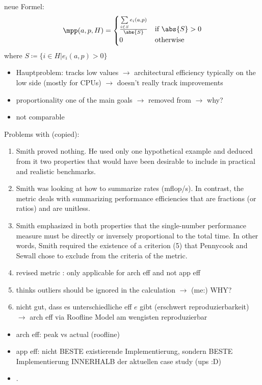 neue Formel:
\[ \mpp(a, p, H) = 
        \begin{cases}
            \frac{\sum\limits_{i \in S} e_i(a, p)}{\abs{S}} & \text{if }\abs{S} > 0 \\
            0                         & \text{otherwise}
        \end{cases} 
\]
where $S \coloneqq \{ i \in H | e_i(a, p) > 0 \}$

\begin{itemize}
    \item \pp Hauptproblem: tracks low values $\rightarrow$ architectural efficiency typically on the low side (mostly for CPUs) $\rightarrow$ \pp doesn't really track improvements
    \item proportionality one of the main goals $\rightarrow$ removed from \pp $\rightarrow$ why?
    \item not comparable
    
\end{itemize}

Problems with \cite{smith_characterizing_1988} (copied):
\begin{enumerate}
    \item Smith proved nothing. He used only one hypothetical example and deduced from it two properties that would have been desirable to include in practical and realistic benchmarks.
    \item Smith was looking at how to summarize rates (mflop/s). In contrast, the \pp metric deals with summarizing performance efficiencies that are fractions (or ratios) and are unitless.
    \item Smith emphasized in both properties that the single-number performance measure must be directly or inversely proportional to the total time.  In other words, Smith required the existence of a criterion (5) that Pennycook and Sewall chose to exclude from the criteria of the \pp metric.
    \item revised metric \pp: only applicable for arch eff and not app eff
    \item thinks outliers should be ignored in the \mpp calculation $\rightarrow$ (me:) WHY?
    \item nicht gut, dass es unterschiedliche eff $e$ gibt (erschwert reproduzierbarkeit) $\rightarrow$ arch eff via Roofline Model am wengisten reproduzierbar
\end{enumerate}


\newpage 
\cite{marowka_portability_2024}

\begin{itemize}
    \item arch eff: peak vs actual (roofline)
    \item app eff: nicht BESTE existierende Implementierung, sondern BESTE Implementierung INNERHALB der aktuellen case study (ups :D)
    \item .
\end{itemize}

